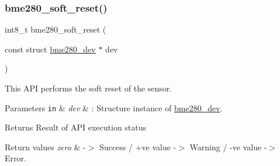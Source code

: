 \subsubsection{\texorpdfstring{bme280\+\_\+soft\+\_\+reset()}{bme280\_soft\_reset()}}
{\footnotesize\ttfamily int8\+\_\+t bme280\+\_\+soft\+\_\+reset (\begin{DoxyParamCaption}\item[{const struct \hyperlink{structbme280__dev}{bme280\+\_\+dev} $\ast$}]{dev }\end{DoxyParamCaption})}



This A\+PI performs the soft reset of the sensor. 


\begin{DoxyParams}[1]{Parameters}
\mbox{\tt in}  & {\em dev} & \+: Structure instance of \hyperlink{structbme280__dev}{bme280\+\_\+dev}.\\
\hline
\end{DoxyParams}
\begin{DoxyReturn}{Returns}
Result of A\+PI execution status 
\end{DoxyReturn}

\begin{DoxyRetVals}{Return values}
{\em zero} & -\/$>$ Success / +ve value -\/$>$ Warning / -\/ve value -\/$>$ Error. \\
\hline
\end{DoxyRetVals}
